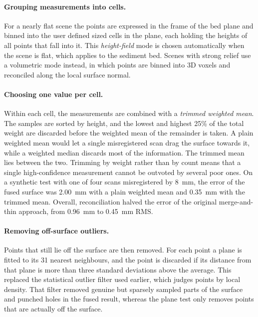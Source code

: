 \paragraph{Grouping measurements into cells.} For a nearly flat scene the points are expressed in the frame of the bed plane and binned into the user defined sized cells in the plane, each holding the heights of all points that fall into it. This \emph{height-field} mode is chosen automatically when the scene is flat, which applies to the sediment bed. Scenes with strong relief use a volumetric mode instead, in which points are binned into 3D voxels and reconciled along the local surface normal.

\paragraph{Choosing one value per cell.} Within each cell, the measurements are combined with a \emph{trimmed weighted mean}. The samples are sorted by height, and the lowest and highest 25\% of the total weight are discarded before the weighted mean of the remainder is taken. A plain weighted mean would let a single misregistered scan drag the surface towards it, while a weighted median discards most of the information. The trimmed mean lies between the two. Trimming by weight rather than by count means that a single high-confidence measurement cannot be outvoted by several poor ones. On a synthetic test with one of four scans misregistered by 8~mm, the error of the fused surface was 2.00~mm with a plain weighted mean and 0.35~mm with the trimmed mean. Overall, reconciliation halved the error of the original merge-and-thin approach, from 0.96~mm to 0.45~mm RMS.

\paragraph{Removing off-surface outliers.} Points that still lie off the surface are then removed. For each point a plane is fitted to its 31 nearest neighbours, and the point is discarded if its distance from that plane is more than three standard deviations above the average. This replaced the statistical outlier filter used earlier, which judges points by local density. That filter removed genuine but sparsely sampled parts of the surface and punched holes in the fused result, whereas the plane test only removes points that are actually off the surface.

